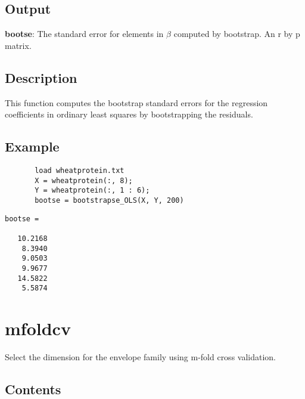 \documentclass[a4paper,11pt,openany]{memoir}
\begin{document}
\subsection*{Output}

\begin{par}
\textbf{bootse}: The standard error for elements in $\beta$ computed by bootstrap.  An r by p matrix.
\end{par} \vspace{1em}


\subsection*{Description}

\begin{par}
This function computes the bootstrap standard errors for the regression coefficients in ordinary least squares by bootstrapping the residuals.
\end{par} \vspace{1em}


\subsection*{Example}


\begin{verbatim}       load wheatprotein.txt
       X = wheatprotein(:, 8);
       Y = wheatprotein(:, 1 : 6);
       bootse = bootstrapse_OLS(X, Y, 200)\end{verbatim}
    
        \color{lightgray}\ttfamily \begin{verbatim}
bootse =

   10.2168
    8.3940
    9.0503
    9.9677
   14.5822
    5.5874

\end{verbatim} \rmfamily
\color{black}

\newpage

\rmfamily
\color{black}    
\section{mfoldcv}

\begin{par}
Select the dimension for the envelope family using m-fold cross validation.
\end{par} \vspace{1em}

\subsection*{Contents}
\end{document}
